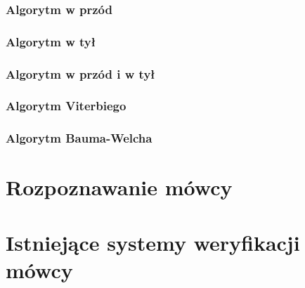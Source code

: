 \subsubsection{Algorytm w przód}

\subsubsection{Algorytm w tył}

\subsubsection{Algorytm w przód i w tył}

\subsubsection{Algorytm Viterbiego}

\subsubsection{Algorytm Bauma-Welcha}


\section{Rozpoznawanie mówcy}\label{sec:rozpoznawanie_mowcy}





\section{Istniejące systemy weryfikacji mówcy}\label{sec:istniejace_systemy}

